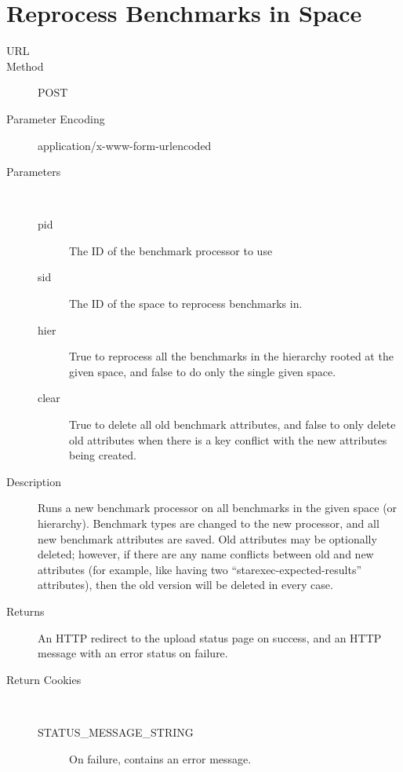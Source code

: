 \section{Reprocess Benchmarks in Space}
\begin{description}
\item [URL] 
\item [Method] POST
\item [Parameter Encoding] application/x-www-form-urlencoded
\item [Parameters] \
	\begin{description}
	\item [pid]  The ID of the benchmark processor to use
	\item [sid] \type{Integer} The ID of the space to reprocess benchmarks in.
	\item [hier]  True to reprocess all the benchmarks in the hierarchy rooted at the given space, and false to do only the single given space.
	\item [clear] \type{Boolean} True to delete all old benchmark attributes, and false to only delete old attributes when there is a key conflict with the new attributes being created.
	\end{description}
\item [Description] Runs a new benchmark processor on all benchmarks in the given space (or hierarchy). Benchmark types are changed to the new processor, and all new benchmark attributes are saved. Old attributes may be optionally deleted; however, if there are any name conflicts between old and new attributes (for example, like having two “starexec-expected-results” attributes), then the old version will be deleted in every case.
\item [Returns] An HTTP redirect to the upload status page on success, and an HTTP message with an error status on failure.
\item [Return Cookies] \
	\begin{description}
	\item [STATUS\_MESSAGE\_STRING]  On failure, contains an error message.
	\end{description}
\end{description}


